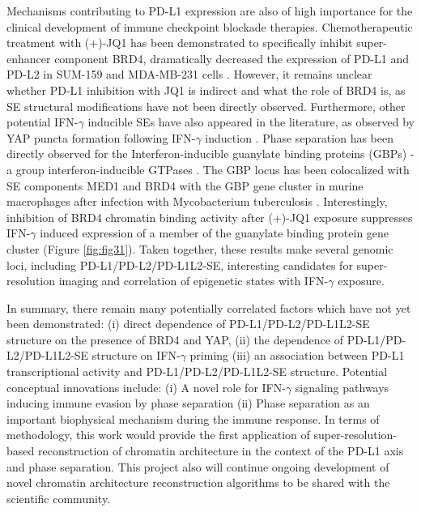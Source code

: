 Mechanisms contributing to PD-L1 expression are also of high importance for the clinical development of immune checkpoint blockade therapies. Chemotherapeutic treatment with (+)-JQ1 has been demonstrated to specifically inhibit super-enhancer component BRD4, dramatically decreased the expression of PD-L1 and PD-L2 in SUM-159 and MDA-MB-231 cells \parencite{Xu2019}. However, it remains unclear whether PD-L1 inhibition with JQ1 is indirect and what the role of BRD4 is, as SE structural modifications have not been directly observed. Furthermore, other potential IFN-$\gamma$ inducible SEs have also appeared in the literature, as observed by YAP puncta formation following IFN-$\gamma$ induction \parencite{Yu2021}. Phase separation has been directly observed for the Interferon-inducible guanylate binding proteins (GBPs) - a group interferon-inducible GTPases \parencite{Siwek2020}. The GBP locus has been colocalized with SE components MED1 and BRD4 with the GBP gene cluster in murine macrophages after infection with Mycobacterium tuberculosis \parencite{Lin2022}. Interestingly, inhibition of BRD4 chromatin binding activity after (+)-JQ1 exposure suppresses IFN-$\gamma$ induced expression of a member of the guanylate binding protein gene cluster (Figure \ref{fig:fig31}). Taken together, these results make several genomic loci, including PD-L1/PD-L2/PD-L1L2-SE, interesting candidates for super-resolution imaging and correlation of epigenetic states with IFN-$\gamma$ exposure.

In summary, there remain many potentially correlated factors which have not yet been demonstrated: (i) direct dependence of PD-L1/PD-L2/PD-L1L2-SE structure on the presence of BRD4 and YAP, (ii) the dependence of PD-L1/PD-L2/PD-L1L2-SE structure on IFN-$\gamma$ priming (iii) an association between PD-L1 transcriptional activity and PD-L1/PD-L2/PD-L1L2-SE structure. Potential conceptual innovations include: (i) A novel role for IFN-$\gamma$ signaling pathways inducing immune evasion by phase separation (ii) Phase separation as an important biophysical mechanism during the immune response. In terms of methodology, this work would provide the first application of super-resolution-based reconstruction of chromatin architecture in the context of the PD-L1 axis and phase separation. This project also will continue ongoing development of novel chromatin architecture reconstruction algorithms to be shared with the scientific community.
